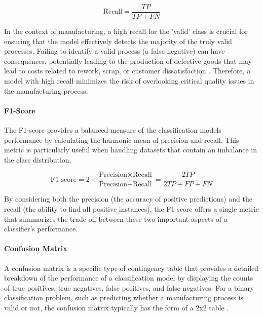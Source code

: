 \begin{equation}
  \label{eq:recall}
  \text{Recall} = \frac{TP}{TP + FN}
\end{equation}

In the context of manufacturing, a high recall for the 'valid' class is crucial for ensuring that the model effectively detects the majority of the truly valid processes. Failing to identify a valid process (a false negative) can have consequences, potentially leading to the production of defective goods that may lead to costs related to rework, scrap, or customer dissatisfaction \autocite{kharitonov2022comparative}. Therefore, a model with high recall minimizes the risk of overlooking critical quality issues in the manufacturing process.

\paragraph{\textbf{F1-Score}}
The F1-score provides a balanced measure of the classification models performance by calculating the harmonic mean of precision and recall. This metric is particularly useful when handling datasets that contain an imbalance in the class distribution.

\begin{equation}
  \label{eq:F1-score}
  \text{F1-score} = 2 \times \frac{\text{Precision} \times \text{Recall}}{\text{Precision} + \text{Recall}} = \frac{2TP}{2TP + FP + FN}
\end{equation}

By considering both the precision (the accuracy of positive predictions) and the recall (the ability to find all positive instances), the F1-score offers a single metric that summarizes the trade-off between these two important aspects of a classifier's performance.

\paragraph{\textbf{Confusion Matrix}}
A confusion matrix is a specific type of contingency table that provides a detailed breakdown of the performance of a classification model by displaying the counts of true positives, true negatives, false positives, and false negatives. For a binary classification problem, such as predicting whether a manufacturing process is valid or not, the confusion matrix typically has the form of a 2x2 table \autocite{fahrmeir2016statistik}.


